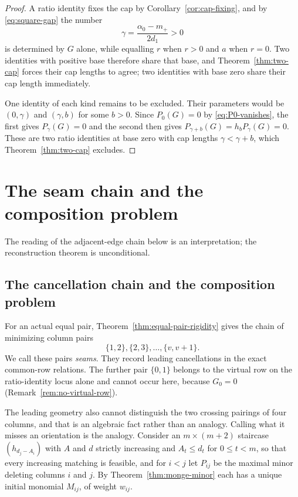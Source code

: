 \documentclass[11pt,a4paper]{amsart}
\numberwithin{equation}{section}
\theoremstyle{plain}
\theoremstyle{definition}
\begin{document}
\begin{proof}
A ratio identity fixes the cap by Corollary~\ref{cor:cap-fixing}, and by \eqref{eq:square-gap} the number
\[
\gamma=\frac{\alpha_0-m_+}{2d_1}>0
\]
is determined by \(G\) alone, while equalling \(r\) when \(r>0\) and \(a\) when \(r=0\).  Two identities with positive base therefore share that base, and Theorem~\ref{thm:two-cap} forces their cap lengths to agree; two identities with base zero share their cap length immediately.

One identity of each kind remains to be excluded.  Their parameters would be \((0,\gamma)\) and \((\gamma,b)\) for some \(b>0\).  Since \(P_0(G)=0\) by \eqref{eq:P0-vanishes}, the first gives \(P_\gamma(G)=0\) and the second then gives \(P_{\gamma+b}(G)=h_bP_\gamma(G)=0\).  These are two ratio identities at base zero with cap lengths \(\gamma<\gamma+b\), which Theorem~\ref{thm:two-cap} excludes.
\end{proof}

\section{The seam chain and the composition problem}\label{sec:application}

The reading of the adjacent-edge chain below is an interpretation; the
reconstruction theorem is unconditional.

\subsection{The cancellation chain and the composition problem}\label{subsec:seam-interpretation}

For an actual equal pair, Theorem~\ref{thm:equal-pair-rigidity} gives the
chain of minimizing column pairs
\begin{equation}\label{eq:tropical-seam-chain}
\{1,2\},\{2,3\},\ldots,\{v,v+1\}.
\end{equation}
We call these pairs \emph{seams}.  They record leading
cancellations in the exact common-row relations.  The further pair
\(\{0,1\}\) belongs to the virtual row on the ratio-identity locus alone
and cannot occur here, because \(G_0=0\)
(Remark~\ref{rem:no-virtual-row}).

The leading geometry also cannot distinguish the two crossing pairings of
four columns, and that is an algebraic fact rather than an analogy.
Calling what it misses an orientation is the analogy.  Consider
an \(m\times(m+2)\) staircase \((h_{d_j-A_i})\) with
\(A\) and \(d\) strictly increasing and \(A_t\le d_t\) for \(0\le t<m\),
so that every increasing matching is feasible, and for \(i<j\) let
\(P_{ij}\) be the maximal minor deleting columns \(i\) and \(j\).  By
Theorem~\ref{thm:monge-minor} each has a unique initial monomial
\(M_{ij}\), of weight \(w_{ij}\).
\end{document}
